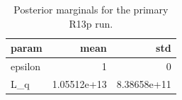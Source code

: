 \begin{table}[t]
\centering
\begin{tabular}{lrr}
\toprule
param & mean & std \\
\midrule
epsilon & 1 & 0 \\
L\_q & 1.05512e+13 & 8.38658e+11 \\
\bottomrule
\end{tabular}

\caption{Posterior marginals for the primary R13p run.}
\label{tab:r13p_marginals}
\end{table}

